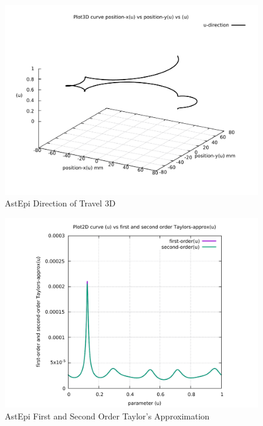 \begin{figure}
	\caption     {AstEpi Direction of Travel 3D}
	\label{04-img-AstEpi Direction of Travel 3D.pdf}
\includegraphics[width=1.00\textwidth]{Chap4/appendix/app-AstEpi/plots/04-img-AstEpi Direction of Travel 3D.pdf}
\end{figure}

\clearpage
\pagebreak

\begin{figure}
	\caption     {AstEpi First and Second Order Taylor's Approximation}
	\label{05-img-AstEpi-First-and-Second-Order-Taylors-Approx.pdf}
\includegraphics[width=1.00\textwidth]{Chap4/appendix/app-AstEpi/plots/05-img-AstEpi-First-and-Second-Order-Taylors-Approx.pdf}
\end{figure}


